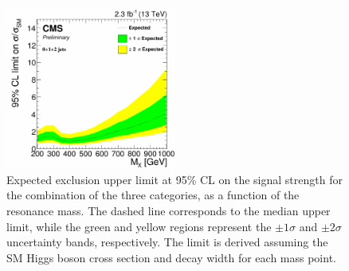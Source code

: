 \begin{figure}[!htb]
\centering
\includegraphics[width=0.5\textwidth]{images/13TeV/HighMass/exp_limit_012jet_mu.pdf}
\caption{Expected exclusion upper limit at 95\% CL on the signal strength for the combination of the three categories, as a function of the resonance mass. The dashed line corresponds to the median upper limit, while the green and yellow regions represent the $\pm 1\sigma$ and $\pm 2 \sigma$ uncertainty bands, respectively. The limit is derived assuming the SM Higgs boson cross section and decay width for each mass point.}\label{fig:13TeVcombexplim}
\end{figure}




